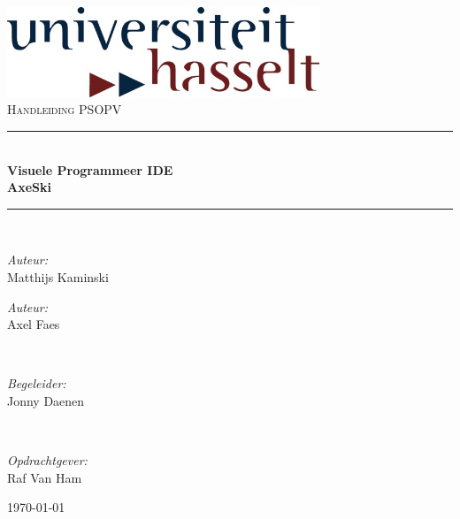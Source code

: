 \documentclass[]{article}
\newcommand{\HRule}{\rule{\linewidth}{0.5mm}}
\begin{document}
\begin{titlepage}
\begin{center}

\includegraphics[width=0.7\textwidth]{./TitlePage/logo_UHasselt.png}~\\[1cm]

\textsc{\Large Handleiding PSOPV}\\[0.5cm]

\HRule \\[0.4cm]
{ \huge \bfseries Visuele Programmeer IDE \\ AxeSki \\[0.4cm] }

\HRule \\[1.5cm]

\noindent
\begin{minipage}{0.4\textwidth}
	\begin{flushleft} \large
	\emph{Auteur:}\\
	Matthijs Kaminski
	\end{flushleft}
	\end{minipage}%
\begin{minipage}{0.4\textwidth}
	\begin{flushright} \large
	\emph{Auteur:} \\
	Axel Faes
	\end{flushright}
\end{minipage}
\\[1cm]
\begin{minipage}{0.4\textwidth}
	\begin{center} \large
	\emph{Begeleider: } \\
	Jonny Daenen 
	\end{center} \large
\end{minipage}
\\[1cm]
\begin{minipage}{0.4\textwidth}
	\begin{center} \large
	\emph{Opdrachtgever:} \\
	Raf Van Ham
	\end{center}
\end{minipage}

\vfill

{\large \today}

\end{center}
\end{titlepage}

\tableofcontents
\newpage

\end{document}
